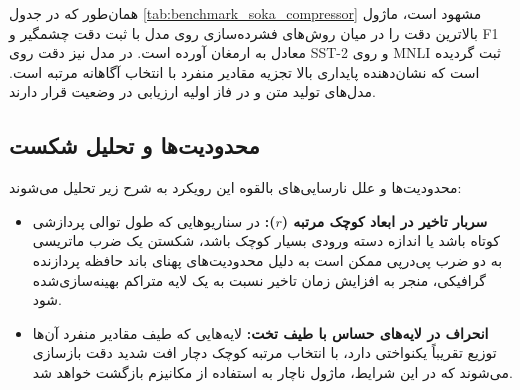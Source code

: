 همان‌طور که در جدول \ref{tab:benchmark_soka_compressor} مشهود است، ماژول  بالاترین دقت را در میان روش‌های فشرده‌سازی روی مدل  با ثبت دقت چشمگیر  و F1 معادل  به ارمغان آورده است. در مدل  نیز دقت  روی SST-2 و  روی MNLI ثبت گردیده است که نشان‌دهنده پایداری بالا تجزیه مقادیر منفرد با انتخاب آگاهانه مرتبه است. مدل‌های تولید متن  و  در فاز اولیه ارزیابی در وضعیت  قرار دارند.

\subsection{محدودیت‌ها و تحلیل شکست}
محدودیت‌ها و علل نارسایی‌های بالقوه این رویکرد به شرح زیر تحلیل می‌شوند:
\begin{itemize}
    \item \textbf{سربار تاخیر در ابعاد کوچک مرتبه ($r$):} در سناریوهایی که طول توالی پردازشی کوتاه باشد یا اندازه دسته ورودی بسیار کوچک باشد، شکستن یک ضرب ماتریسی به دو ضرب پی‌درپی ممکن است به دلیل محدودیت‌های پهنای باند حافظه پردازنده گرافیکی، منجر به افزایش زمان تاخیر نسبت به یک لایه متراکم بهینه‌سازی‌شده شود.
    \item \textbf{انحراف در لایه‌های حساس با طیف تخت:} لایه‌هایی که طیف مقادیر منفرد آن‌ها توزیع تقریباً یکنواختی دارد، با انتخاب مرتبه کوچک دچار افت شدید دقت بازسازی می‌شوند که در این شرایط، ماژول ناچار به استفاده از مکانیزم بازگشت خواهد شد.
\end{itemize}
